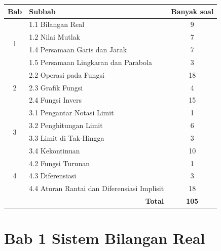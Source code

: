 \documentclass[10pt,openany,a4paper]{article}
\theoremstyle{definition}
\theoremstyle{definition}
\theoremstyle{plain}
\begin{document}
\begin{center}
\begin{tabular}{|c|l|c|}
\hline
\textbf{Bab} & \textbf{Subbab} & \textbf{Banyak soal}\\ \hline
\multirow{4}{*}{1} & 1.1 Bilangan Real & 9\\ \cline{2-3}
 & 1.2 Nilai Mutlak & 7\\ \cline{2-3}
 & 1.4 Persamaan Garis dan Jarak & 7\\ \cline{2-3}
 & 1.5 Persamaan Lingkaran dan Parabola & 3\\ \hline
\multirow{3}{*}{2} & 2.2 Operasi pada Fungsi & 18\\ \cline{2-3}
 & 2.3 Grafik Fungsi & 4\\ \cline{2-3}
 & 2.4 Fungsi Invers & 15\\ \hline
\multirow{4}{*}{3} & 3.1 Pengantar Notasi Limit & 1\\ \cline{2-3}
 & 3.2 Penghitungan Limit & 6\\ \cline{2-3}
 & 3.3 Limit di Tak-Hingga & 3\\ \cline{2-3}
 & 3.4 Kekontinuan & 10\\ \hline
\multirow{3}{*}{4} & 4.2 Fungsi Turunan & 1\\ \cline{2-3}
 & 4.3 Diferensiasi & 3\\ \cline{2-3}
 & 4.4 Aturan Rantai dan Diferensiasi Implisit & 18\\ \hline
\multicolumn{2}{|r|}{\textbf{Total}} & \textbf{105}\\ \hline
\end{tabular}
\end{center}
\newpage

\section*{Bab 1 \quad Sistem Bilangan Real}
\end{document}

